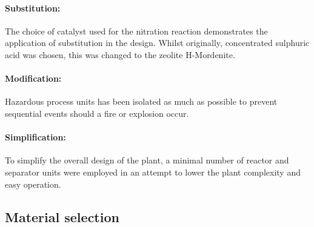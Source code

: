 \paragraph{Substitution:} The choice of catalyst used for the nitration reaction demonstrates the application of substitution in the design. Whilst originally, concentrated sulphuric acid was chosen, this was changed to the zeolite H-Mordenite. 

\paragraph{Modification:} Hazardous process units has been isolated as much as possible to prevent sequential events should a fire or explosion occur. 

\paragraph{Simplification:} To simplify the overall design of the plant, a minimal number of reactor and separator units were employed in an attempt to lower the plant complexity and easy operation.  


\subsection{Material selection}